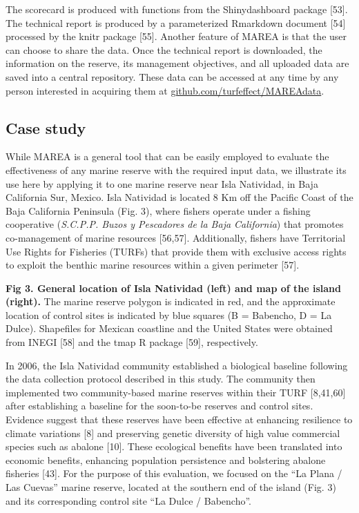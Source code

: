\documentclass[12pt,]{article}
\begin{document}
The scorecard is produced with functions from the Shinydashboard package
{[}53{]}. The technical report is produced by a parameterized Rmarkdown
document {[}54{]} processed by the knitr package {[}55{]}. Another
feature of MAREA is that the user can choose to share the data. Once the
technical report is downloaded, the information on the reserve, its
management objectives, and all uploaded data are saved into a central
repository. These data can be accessed at any time by any person
interested in acquiring them at \url{github.com/turfeffect/MAREAdata}.

\subsection{Case study}\label{case-study}

While MAREA is a general tool that can be easily employed to evaluate
the effectiveness of any marine reserve with the required input data, we
illustrate its use here by applying it to one marine reserve near Isla
Natividad, in Baja California Sur, Mexico. Isla Natividad is located 8
Km off the Pacific Coast of the Baja California Peninsula (Fig. 3),
where fishers operate under a fishing cooperative (\emph{S.C.P.P. Buzos
y Pescadores de la Baja California}) that promotes co-management of
marine resources {[}56,57{]}. Additionally, fishers have Territorial Use
Rights for Fisheries (TURFs) that provide them with exclusive access
rights to exploit the benthic marine resources within a given perimeter
{[}57{]}.

\textbf{Fig 3. General location of Isla Natividad (left) and map of the
island (right).} The marine reserve polygon is indicated in red, and the
approximate location of control sites is indicated by blue squares (B =
Babencho, D = La Dulce). Shapefiles for Mexican coastline and the United
States were obtained from INEGI {[}58{]} and the tmap R package
{[}59{]}, respectively.

In 2006, the Isla Natividad community established a biological baseline
following the data collection protocol described in this study. The
community then implemented two community-based marine reserves within
their TURF {[}8,41,60{]} after establishing a baseline for the
soon-to-be reserves and control sites. Evidence suggest that these
reserves have been effective at enhancing resilience to climate
variations {[}8{]} and preserving genetic diversity of high value
commercial species such as abalone {[}10{]}. These ecological benefits
have been translated into economic benefits, enhancing population
persistence and bolstering abalone fisheries {[}43{]}. For the purpose
of this evaluation, we focused on the ``La Plana / Las Cuevas'' marine
reserve, located at the southern end of the island (Fig. 3) and its
corresponding control site ``La Dulce / Babencho''.
\end{document}
